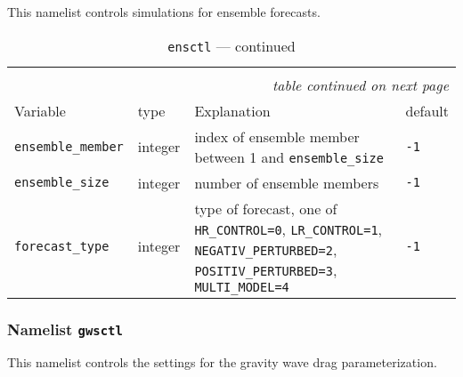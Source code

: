 This namelist controls simulations for ensemble forecasts.


\setlength{\LTcapwidth}{\textwidth}
\setlength{\LTleft}{0pt}\setlength{\LTright}{0pt}

\begin{longtable}{l@{\extracolsep\fill}lp{5.0cm}p{3.0cm}}
\hline\hline\caption[Namelist {\tt ensctl}]{Namelist
  {\tt ensctl}}\\\hline\label{tabensctl}
\endfirsthead
\caption[]{{\tt ensctl} --- continued}\\\hline
\endhead
\hline\multicolumn{4}{r}{\slshape table continued on next page}\\
\endfoot
\hline %
\endlastfoot
Variable & type & Explanation & default \\\hline

{\tt ensemble\_member}\index{namelist variables!ensemble\_member}
 & integer & index of ensemble member between 1
and {\tt ensemble\_size} & {\tt -1} \\
{\tt ensemble\_size}\index{namelist variables!ensemble\_size}
   & integer & number of ensemble members & {\tt -1} \\
{\tt forecast\_type}\index{namelist variables!forecast\_type}
   & integer & type of forecast, one of {\tt
  HR\_CONTROL=0}, {\tt LR\_CONTROL=1}, {\tt NEGATIV\_PERTURBED=2}, {\tt
  POSITIV\_PERTURBED=3}, {\tt MULTI\_MODEL=4}& {\tt -1}\\

\end{longtable}

\subsubsection{Namelist {\tt gwsctl}}\label{secgwsctl}

This namelist controls the settings for the gravity wave drag
parameterization. 

\setlength{\LTcapwidth}{\textwidth}
\setlength{\LTleft}{0pt}\setlength{\LTright}{0pt}

